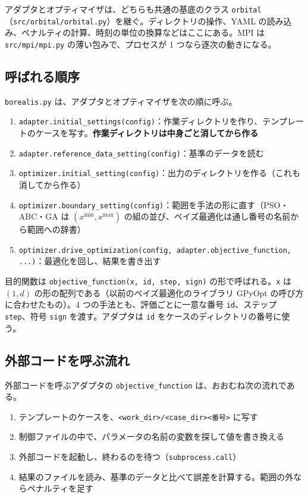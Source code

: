 \documentclass[11pt,a4paper,dvipdfmx]{jsarticle}
\begin{document}
アダプタとオプティマイザは、どちらも共通の基底のクラス \texttt{orbital}（\texttt{src/orbital/orbital.py}）を継ぐ。ディレクトリの操作、YAML の読み込み、ペナルティの計算、時刻の単位の換算などはここにある。MPI は \texttt{src/mpi/mpi.py} の薄い包みで、プロセスが 1 つなら逐次の動きになる。

\subsection{呼ばれる順序}

\texttt{borealis.py} は、アダプタとオプティマイザを次の順に呼ぶ。

\begin{enumerate}
\item \texttt{adapter.initial\_settings(config)}：作業ディレクトリを作り、テンプレートのケースを写す。\textbf{作業ディレクトリは中身ごと消してから作る}
\item \texttt{adapter.reference\_data\_setting(config)}：基準のデータを読む
\item \texttt{optimizer.initial\_setting(config)}：出力のディレクトリを作る（これも消してから作る）
\item \texttt{optimizer.boundary\_setting(config)}：範囲を手法の形に直す（PSO・ABC・GA は $(x^{\min}, x^{\max})$ の組の並び、ベイズ最適化は通し番号の名前から範囲への辞書）
\item \texttt{optimizer.drive\_optimization(config, adapter.objective\_function, ...)}：最適化を回し、結果を書き出す
\end{enumerate}

目的関数は \texttt{objective\_function(x, id, step, sign)} の形で呼ばれる。\texttt{x} は $(1, d)$ の形の配列である（以前のベイズ最適化のライブラリ GPyOpt の呼び方に合わせたもの）。4 つの手法とも、評価ごとに一意な番号 \texttt{id}、ステップ \texttt{step}、符号 \texttt{sign} を渡す。アダプタは \texttt{id} をケースのディレクトリの番号に使う。

\subsection{外部コードを呼ぶ流れ}

外部コードを呼ぶアダプタの \texttt{objective\_function} は、おおむね次の流れである。

\begin{enumerate}
\item テンプレートのケースを、\texttt{<work\_dir>/<case\_dir><番号>} に写す
\item 制御ファイルの中で、パラメータの名前の変数を探して値を書き換える
\item 外部コードを起動し、終わるのを待つ（\texttt{subprocess.call}）
\item 結果のファイルを読み、基準のデータと比べて誤差を計算する。範囲の外ならペナルティを足す
\end{enumerate}
\end{document}
